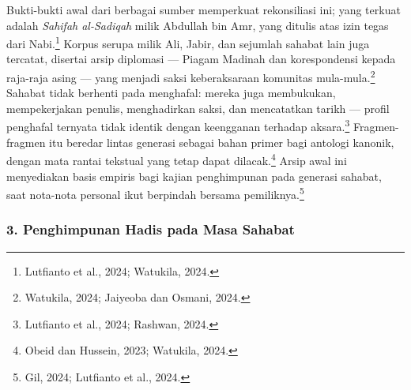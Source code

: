 Bukti-bukti awal dari berbagai sumber memperkuat rekonsiliasi ini; yang terkuat adalah \textit{Sahifah al-Sadiqah} milik Abdullah bin Amr, yang ditulis atas izin tegas dari Nabi.\footnote{Lutfianto et al., 2024; Watukila, 2024.} Korpus serupa milik Ali, Jabir, dan sejumlah sahabat lain juga tercatat, disertai arsip diplomasi --- Piagam Madinah dan korespondensi kepada raja-raja asing --- yang menjadi saksi keberaksaraan komunitas mula-mula.\footnote{Watukila, 2024; Jaiyeoba dan Osmani, 2024.} Sahabat tidak berhenti pada menghafal: mereka juga membukukan, mempekerjakan penulis, menghadirkan saksi, dan mencatatkan tarikh --- profil penghafal ternyata tidak identik dengan keengganan terhadap aksara.\footnote{Lutfianto et al., 2024; Rashwan, 2024.} Fragmen-fragmen itu beredar lintas generasi sebagai bahan primer bagi antologi kanonik, dengan mata rantai tekstual yang tetap dapat dilacak.\footnote{Obeid dan Hussein, 2023; Watukila, 2024.} Arsip awal ini menyediakan basis empiris bagi kajian penghimpunan pada generasi sahabat, saat nota-nota personal ikut berpindah bersama pemiliknya.\footnote{Gil, 2024; Lutfianto et al., 2024.}

\subsubsection*{3. Penghimpunan Hadis pada Masa Sahabat}

